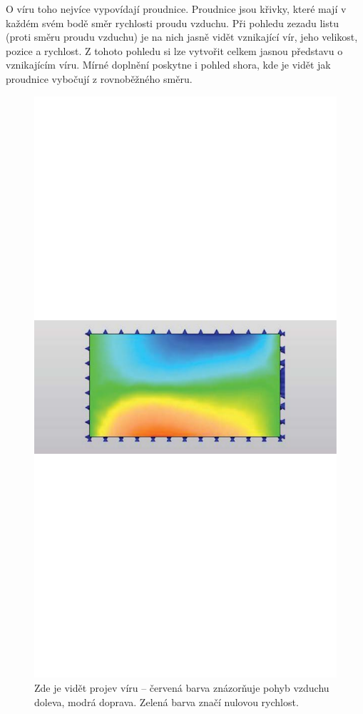 O víru toho nejvíce vypovídají proudnice. Proudnice jsou křivky, které mají v každém svém bodě směr rychlosti proudu vzduchu. Při pohledu zezadu listu (proti směru proudu vzduchu) je na nich jasně vidět vznikající vír, jeho velikost, pozice a rychlost. Z tohoto pohledu si lze vytvořit celkem jasnou představu o vznikajícím víru. Mírné doplnění poskytne i pohled shora, kde je vidět jak proudnice vybočují z rovnoběžného směru.

\begin{figure}[H]
	\centering
	\includegraphics[]{obrazky/simulace/simulace1p}
	\caption{Zde je vidět projev víru – červená barva znázorňuje pohyb vzduchu doleva, modrá doprava. Zelená barva značí nulovou rychlost.}
	\label{sim:1}
\end{figure}
